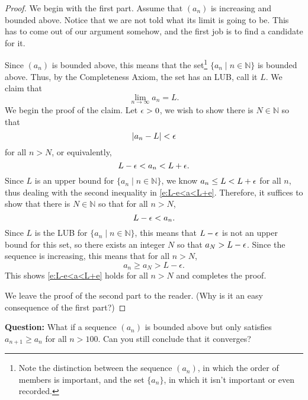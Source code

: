 \documentclass[11pt,dvipsnames]{book}
\numberwithin{equation}{section} %
\numberwithin{figure}{section} %
\numberwithin{table}{section} %
\begin{document}
\begin{proof}
We begin with the first part. Assume that $(a_n)$ is increasing and bounded above. Notice that we are not told what its limit is going to be. This has to come out of our argument somehow, and the first job is to find a candidate for it. 

Since $(a_{n})$ is bounded above, this means that the set\footnote{Note the distinction between the sequence $(a_n)$, in which the order of members is important, and the set $\{ a_n\}$, in which it isn't important or even recorded.} $\{a_{n}\; | \; n\in\mathbb{N}\}$ is bounded above. Thus, by the Completeness Axiom, the set has an LUB, call it $L$. We claim that
\[
\lim_{n\rightarrow\infty}a_{n}=L.
\]
We begin the proof of the claim. Let $\epsilon>0$, we wish to show there is $N\in\mathbb{N}$ so that 
\[
|a_{n}-L|<\epsilon
\]
for all $n> N$, or equivalently,
\begin{equation}
\label{e:L-e<a<L+e}
L-\epsilon<a_{n}<L+\epsilon.
\end{equation}
Since $L$ is an upper bound for $\{a_{n}\; | \; n\in\mathbb{N}\}$, we know $a_{n}\leq L<L+\epsilon$ for all $n$, thus dealing with the second inequality in \eqref{e:L-e<a<L+e}. Therefore, it suffices to show that there is $N\in\mathbb{N}$ so that for all $n> N$,
\[
L-\epsilon<a_{n}.
\]
Since $L$ is the LUB for $\{a_{n}\; | \; n\in\mathbb{N}\}$, this means that $L-\epsilon$ is not an upper bound for this set, so there exists an integer $N$ so that $a_{N}>L-\epsilon$. Since the sequence is increasing, this means that for all $n> N$,
\[
a_{n} \geq a_N > L - \epsilon.
\]
This shows \eqref{e:L-e<a<L+e} holds for all $n>N$ and completes the proof.

\medskip
We leave the proof of the second part to the reader. (Why is it an easy consequence of the first part?)
\end{proof}
\noindent
{\bf Question:} What if a sequence $(a_n)$ is bounded above but only satisfies $a_{n+1} \geq a_{n}$ for all $n > 100$. Can you still conclude that it converges?
\end{document}

